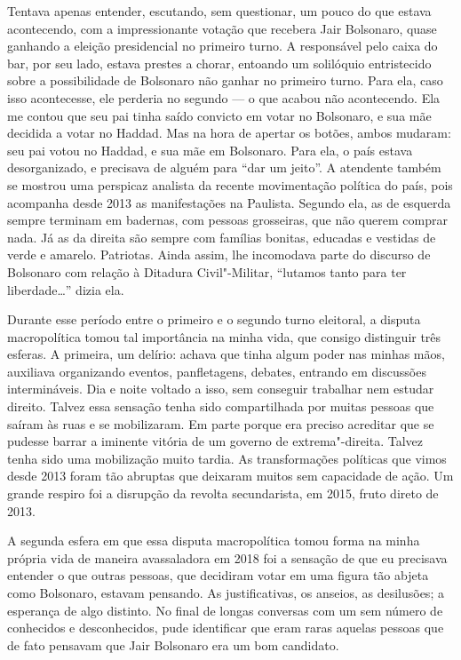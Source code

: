 Tentava apenas entender, escutando, sem questionar, um pouco do que
estava acontecendo, com a impressionante votação que recebera Jair
Bolsonaro, quase ganhando a eleição presidencial no primeiro turno. A
responsável pelo caixa do bar, por seu lado, estava prestes a chorar,
entoando um solilóquio entristecido sobre a possibilidade de Bolsonaro
não ganhar no primeiro turno. Para ela, caso isso acontecesse, ele
perderia no segundo --- o que acabou não acontecendo. Ela me contou
que seu pai tinha saído convicto em votar no Bolsonaro, e sua mãe
decidida a votar no Haddad. Mas na hora de apertar os botões, ambos
mudaram: seu pai votou no Haddad, e sua mãe em Bolsonaro. Para ela, o
país estava desorganizado, e precisava de alguém para ``dar um jeito''.
A atendente também se mostrou uma perspicaz analista da recente
movimentação política do país, pois acompanha desde 2013 as
manifestações na Paulista. Segundo ela, as de esquerda sempre terminam
em badernas, com pessoas grosseiras, que não querem comprar nada. Já as
da direita são sempre com famílias bonitas, educadas e vestidas de
verde e amarelo. Patriotas. Ainda assim, lhe incomodava parte do
discurso de Bolsonaro com relação à Ditadura Civil"-Militar, ``lutamos tanto
para ter liberdade\ldots{}'' dizia ela.

Durante esse período entre o primeiro e o segundo turno eleitoral, a
disputa macropolítica tomou tal importância na minha vida, que consigo
distinguir três esferas. A primeira, um delírio: achava que tinha algum
poder nas minhas mãos, auxiliava organizando eventos, panfletagens, debates,
entrando em discussões intermináveis. Dia e noite voltado a isso, sem
conseguir trabalhar nem estudar direito. Talvez essa sensação tenha sido
compartilhada por muitas pessoas que saíram às ruas e se mobilizaram. Em
parte porque era preciso acreditar que se pudesse barrar a
iminente vitória de um governo de extrema"-direita. Talvez tenha sido uma
mobilização muito tardia. As transformações políticas que vimos desde
2013 foram tão abruptas que deixaram muitos sem capacidade de ação. Um
grande respiro foi a disrupção da revolta secundarista, em 2015, fruto
direto de 2013.

A segunda esfera em que essa disputa macropolítica tomou forma na minha
própria vida de maneira avassaladora em 2018 foi a sensação de que eu
precisava entender o que outras pessoas, que decidiram votar em uma
figura tão abjeta como Bolsonaro, estavam pensando. As justificativas, os anseios,
as desilusões; a esperança de algo distinto. No final de longas
conversas com um sem número de conhecidos e desconhecidos, pude
identificar que eram raras aquelas pessoas que de fato pensavam que Jair
Bolsonaro era um bom candidato.

